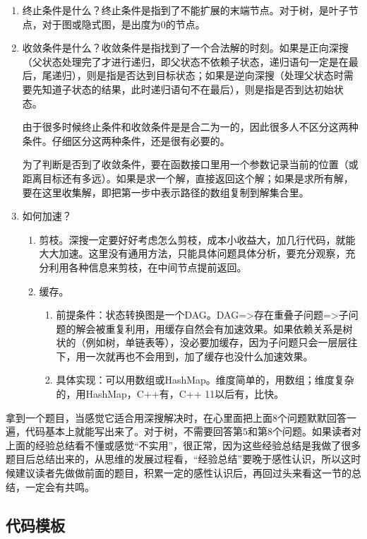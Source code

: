 \begin{enumerate}
	\item 终止条件是什么？终止条件是指到了不能扩展的末端节点。对于树，是叶子节点，对于图或隐式图，是出度为0的节点。
	
	\item 
	{收敛条件是什么？收敛条件是指找到了一个合法解的时刻。如果是正向深搜（父状态处理完了才进行递归，即父状态不依赖子状态，递归语句一定是在最后，尾递归），则是指是否达到目标状态；如果是逆向深搜（处理父状态时需要先知道子状态的结果，此时递归语句不在最后），则是指是否到达初始状态。
		
		由于很多时候终止条件和收敛条件是是合二为一的，因此很多人不区分这两种条件。仔细区分这两种条件，还是很有必要的。
		
		为了判断是否到了收敛条件，要在函数接口里用一个参数记录当前的位置（或距离目标还有多远）。如果是求一个解，直接返回这个解；如果是求所有解，要在这里收集解，即把第一步中表示路径的数组复制到解集合里。}
	
	\item 如何加速？
	\begin{enumerate}
		\item 剪枝。深搜一定要好好考虑怎么剪枝，成本小收益大，加几行代码，就能大大加速。这里没有通用方法，只能具体问题具体分析，要充分观察，充分利用各种信息来剪枝，在中间节点提前返回。
		\item 缓存。
		\begin{enumerate}
			\item 
			前提条件：状态转换图是一个DAG。DAG=>存在重叠子问题=>子问题的解会被重复利用，用缓存自然会有加速效果。如果依赖关系是树状的（例如树，单链表等），没必要加缓存，因为子问题只会一层层往下，用一次就再也不会用到，加了缓存也没什么加速效果。
			\item 具体实现：可以用数组或HashMap。维度简单的，用数组；维度复杂的，用HashMap，C++有，C++ 11以后有，比快。
		\end{enumerate}
		
	\end{enumerate}
\end{enumerate}

拿到一个题目，当感觉它适合用深搜解决时，在心里面把上面8个问题默默回答一遍，代码基本上就能写出来了。对于树，不需要回答第5和第8个问题。如果读者对上面的经验总结看不懂或感觉“不实用”，很正常，因为这些经验总结是我做了很多题目后总结出来的，从思维的发展过程看，“经验总结”要晚于感性认识，所以这时候建议读者先做做前面的题目，积累一定的感性认识后，再回过头来看这一节的总结，一定会有共鸣。


\subsection{代码模板}

